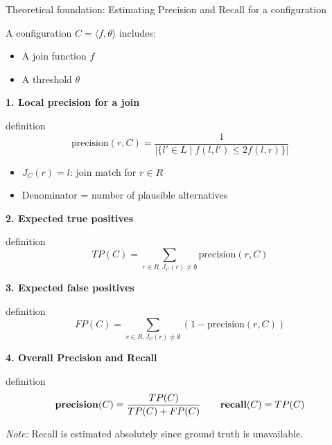 \documentclass[8pt]{beamer} %
\begin{document}
\begin{frame}{Theoretical foundation: Estimating Precision and Recall for a configuration}
	
	\tiny	
	
	A configuration $C = \langle f, \theta \rangle$ includes:
	\begin{itemize}
		\item A join function $f$
		\item A threshold $\theta$
	\end{itemize}
	
	\textbf{1. Local precision for a join}
	
	\begin{beamercolorbox}[rounded=true, shadow=true, leftskip=1em, rightskip=1em]{definition}		
		$$
		\text{precision}(r, C) =
		\frac{1}{
			|\{ l' \in L \mid f(l, l') \leq 2f(l, r) \}|
		}
		$$
	\end{beamercolorbox}
	\begin{itemize}
		\item $J_C(r) = l$: join match for $r \in R$
		\item Denominator = number of plausible alternatives
	\end{itemize}
	
	\textbf{2. Expected true positives}
	\begin{beamercolorbox}[rounded=true, shadow=true, leftskip=1em, rightskip=1em]{definition}		
	$$
	TP(C) = \sum_{r \in R, J_C(r) \neq \emptyset} \text{precision}(r, C)
	$$
	\end{beamercolorbox}
	
	\textbf{3. Expected false positives}
	\begin{beamercolorbox}[rounded=true, shadow=true, leftskip=1em, rightskip=1em]{definition}		
	$$
	FP(C) = \sum_{r \in R, J_C(r) \neq \emptyset} \left(1 - \text{precision}(r, C)\right)
	$$
	\end{beamercolorbox}
	
	\textbf{4. Overall Precision and Recall}
	\begin{beamercolorbox}[rounded=true, shadow=true, leftskip=1em, rightskip=1em]{definition}		
	$$
	\text{\textbf{precision}}(C) = \frac{TP(C)}{TP(C) + FP(C)} \quad\quad
	\text{\textbf{recall}}(C) = TP(C)
	$$
	\end{beamercolorbox}
	
	\textit{Note:} Recall is estimated absolutely since ground truth is unavailable.
\end{frame}
\end{document}
